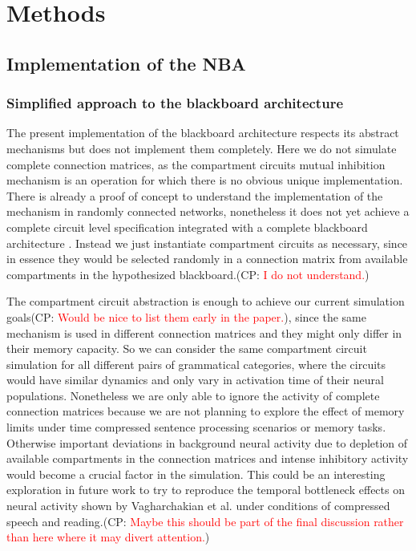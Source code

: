 \documentclass[10pt]{article}
\newcommand{\noteCP}[1]{(CP: \textcolor{red}{#1})}
\begin{document}
\section{Methods}

{\label{488128}}

\subsection{Implementation of the
  NBA}\label{implementation-of-the-nba}

\subsubsection{Simplified approach to the blackboard
  architecture}\label{simplified-approach-to-the-blackboard-architecture}

The present implementation of the blackboard architecture respects its
abstract mechanisms but does not implement them completely. Here we do
not simulate complete connection matrices, as the compartment circuits
mutual inhibition mechanism is an operation for which there is no
obvious unique implementation. There is already a proof of concept to
understand the implementation of the mechanism in randomly connected
networks, nonetheless it does not yet achieve a complete circuit level
specification integrated with a complete blackboard architecture
\cite{van_der_Velde_2011}. Instead we just instantiate compartment
circuits as necessary, since in essence they would be selected
randomly in a connection matrix from available compartments in the
hypothesized blackboard.\noteCP{I do not understand.}

The compartment circuit abstraction is enough to achieve our current
simulation goals\noteCP{Would be nice to list them early in the paper.},
since the same mechanism is used in different connection matrices and
they might only differ in their memory capacity. So we can consider
the same compartment circuit simulation for all different pairs of
grammatical categories, where the circuits would have similar dynamics
and only vary in activation time of their neural populations.
Nonetheless we are only able to ignore the activity of complete
connection matrices because we are not planning to explore the effect
of memory limits under time compressed sentence processing scenarios
or memory tasks. Otherwise important deviations in background neural
activity due to depletion of available compartments in the connection
matrices and intense inhibitory activity would become a crucial factor
in the simulation. This could be an interesting exploration in future
work to try to reproduce the temporal bottleneck effects on neural
activity shown by Vagharchakian et al. under conditions of compressed
speech and reading\cite{Vagharchakian_2012}.\noteCP{Maybe this should
  be part of the final discussion rather than here where it may divert
  attention.}
\end{document}
